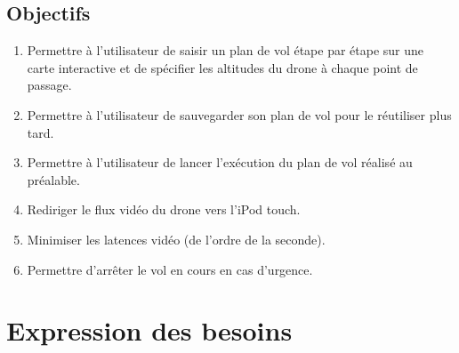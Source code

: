 \documentclass{article}
\begin{document}
	\subsection{Objectifs}
		\begin{enumerate}
        \item Permettre à l'utilisateur de saisir un plan de vol étape par étape sur une carte interactive et de spécifier les altitudes du drone à chaque point de passage.
        \item Permettre à l'utilisateur de sauvegarder son plan de vol pour le réutiliser plus tard.
		 \item Permettre à l'utilisateur de lancer l'exécution du plan de vol réalisé au préalable.
		 \item Rediriger le flux vidéo du drone vers l'iPod touch. 
		 \item Minimiser les latences vidéo (de l'ordre de la seconde).
		 \item Permettre d'arrêter le vol en cours en cas d'urgence.
		\end{enumerate}
\section{Expression des besoins}
\end{document}

